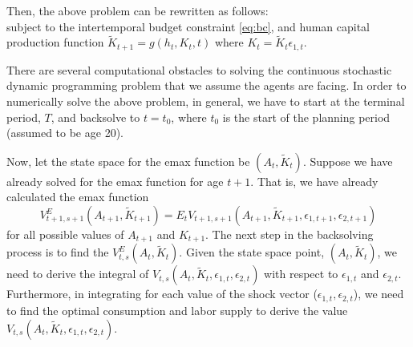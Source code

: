 \documentclass[\econtexRoot/ImaiKeane]{subfiles}
\begin{document}
Then, the above problem can be rewritten as follows:
\begin{equation*}
  \label{eq:valuenoshocks}
  
\end{equation*}
subject to the intertemporal budget constraint \eqref{eq:bc}, and human capital production function $\tilde{K}_{t+1}=g(h_t,K_t,t)$ where $K_t=\tilde{K}_t \epsilon_{1,t}$.\par
There are several computational obstacles to solving the continuous stochastic dynamic programming problem that we assume the agents are facing. In order to numerically solve the above problem, in general, we have to start at the terminal period, $T$, and backsolve to $t = t_0$, where $t_0$ is the start of the planning period (assumed to be age 20).\par
Now, let the state space for the emax function be $(A_t, \tilde{K}_t)$. Suppose we have already solved for the emax function for age $t + 1$. That is, we have already calculated the emax function
\begin{equation*}
V^E_{t+1,s+1}(A_{t+1},\tilde{K}_{t+1}) = E_t V_{t+1,s+1}(A_{t+1},\tilde{K}_{t+1},\epsilon_{1,t+1},\epsilon_{2,t+1}) 
\end{equation*}
for all possible values of $A_{t+1}$ and $K_{t+1}$. The next step in the backsolving process is to find the $V^E_{t,s} (A_t,\tilde{K}_t)$. Given the state space point, $(A_t, \tilde{K}_t)$, we need to derive the integral of $V_{t,s}(A_t, \tilde{K}_t, \epsilon_{1,t},\epsilon_{2,t})$ with respect to $\epsilon_{1,t}$ and $\epsilon_{2,t}$. Furthermore, in integrating for each value of the shock vector ($\epsilon_{1,t},\epsilon_{2,t}$), we need to find the optimal consumption and labor supply to derive the value $V_{t,s}(A_t, \tilde{K}_t, \epsilon_{1,t},\epsilon_{2,t})$. \par
\end{document}
